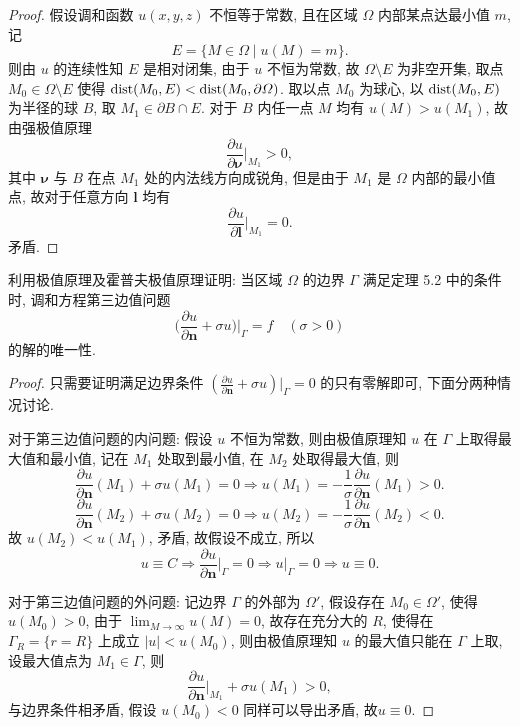 \begin{proof}
  假设调和函数 $u(x,y,z)$ 不恒等于常数, 且在区域 $\varOmega$ 内部某点达最小值 $m$, 记
  \[E = \{ M\in\varOmega \mid u(M) = m\}.\]
  则由 $u$ 的连续性知 $E$ 是相对闭集, 由于 $u$ 不恒为常数, 故 $\varOmega\setminus E$ 为非空开集,
  取点 $M_0\in\varOmega\setminus E$ 使得 $\operatorname{dist}(M_0, E) < \operatorname{dist}(M_0, \partial\varOmega)$.
  取以点 $M_0$ 为球心, 以 $\operatorname{dist}(M_0, E)$ 为半径的球 $B$, 取 $M_1\in \partial B\cap E$.
  对于 $B$ 内任一点 $M$ 均有 $u(M)>u(M_1)$, 故由强极值原理
  \[\frac{\partial u}{\partial\bm{\nu}}\bigg|_{M_1} > 0,\]
  其中 $\bm{\nu}$ 与 $B$ 在点 $M_1$ 处的内法线方向成锐角,
  但是由于 $M_1$ 是 $\varOmega$ 内部的最小值点, 故对于任意方向 $\bm{l}$ 均有
  \[\frac{\partial u}{\partial\bm{l}}\bigg|_{M_1} = 0.\]
  矛盾.
\end{proof}


\begin{exercise}
  利用极值原理及霍普夫极值原理证明: 当区域 $\varOmega$ 的边界 $\varGamma$
  满足定理 5.2 中的条件时, 调和方程第三边值问题
  \[\biggl(\frac{\partial u}{\partial \bm{n}} + \sigma u\biggr)\bigg|_{\varGamma}
    = f \quad (\sigma>0)\]
  的解的唯一性.
\end{exercise}

\begin{proof}
  只需要证明满足边界条件 $(\frac{\partial u}{\partial\bm{n}}+\sigma u)|_{\varGamma}=0$ 的只有零解即可,
  下面分两种情况讨论.

  对于第三边值问题的内问题: 假设 $u$ 不恒为常数, 则由极值原理知 $u$ 在 $\varGamma$ 上取得最大值和最小值,
  记在 $M_1$ 处取到最小值, 在 $M_2$ 处取得最大值, 则
  \[\frac{\partial u}{\partial\bm{n}}(M_1) + \sigma u(M_1) = 0
    \Rightarrow u(M_1) = -\frac{1}{\sigma}\frac{\partial u}{\partial\bm{n}}(M_1)>0.\]
  \[\frac{\partial u}{\partial\bm{n}}(M_2) + \sigma u(M_2) = 0
    \Rightarrow u(M_2) = -\frac{1}{\sigma}\frac{\partial u}{\partial\bm{n}}(M_2)<0.\]
  故 $u(M_2)<u(M_1)$, 矛盾, 故假设不成立, 所以
  \[u\equiv C\Rightarrow\frac{\partial u}{\partial\bm{n}}\bigg|_{\varGamma} = 0
    \Rightarrow u|_{\varGamma}=0\Rightarrow u\equiv 0.\]
  
  对于第三边值问题的外问题: 记边界 $\varGamma$ 的外部为 $\varOmega'$,
  假设存在 $M_0\in\varOmega'$, 使得 $u(M_0)>0$, 由于 $\lim_{M\to\infty}u(M)=0$,
  故存在充分大的 $R$, 使得在 $\varGamma_R = \{r=R\}$ 上成立 $|u|<u(M_0)$,
  则由极值原理知 $u$ 的最大值只能在 $\varGamma$ 上取, 设最大值点为 $M_1\in\varGamma$, 则
  \[\frac{\partial u}{\partial\bm{n}}\bigg|_{M_1}+\sigma u(M_1)>0,\]
  与边界条件相矛盾, 假设 $u(M_0)<0$ 同样可以导出矛盾, 故$u\equiv 0$.
\end{proof}


